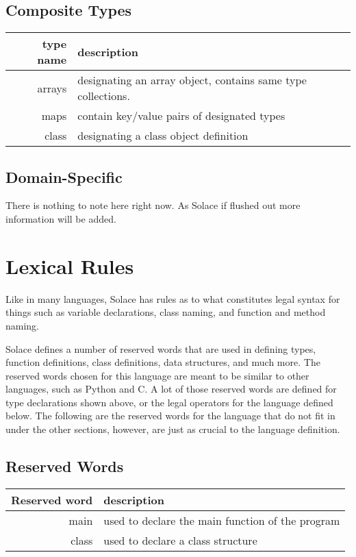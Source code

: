 \documentclass{article}
\begin{document}
\subsection{Composite Types}
\begin{tabular}{r|l}
	type name & description \\
	\hline
	\hline
	arrays & designating an array object, contains same type collections. \\
	maps & contain key/value pairs of designated types \\
	class & designating a class object definition \\
	\hline
\end{tabular}

\subsection{Domain-Specific}
There is nothing to note here right now. As Solace if flushed out more information will be added.


\section{Lexical Rules}
Like in many languages, Solace has rules as to what constitutes legal syntax for things such as
variable declarations, class naming, and function and method naming.

Solace defines a number of reserved words that are used in defining types, function definitions,
class definitions, data structures, and much more. The reserved words chosen for this language
are meant to be similar to other languages, such as Python and C. A lot of those reserved words
are defined for type declarations shown above, or the legal operators for the language defined
below. The following are the reserved words for the language that do not fit in under the other
sections, however, are just as crucial to the language definition.

\subsection{Reserved Words}

\begin{tabular}{r|l}
Reserved word & description \\
\hline
\hline
main & used to declare the main function of the program \\
class & used to declare a class structure \\
\hline
\end{tabular}
\end{document}
